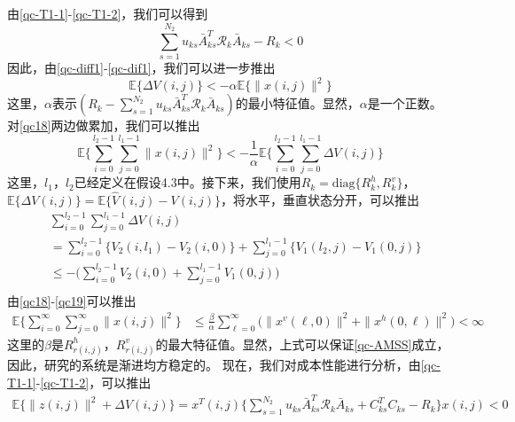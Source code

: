 	由\eqref{qc-T1-1}-\eqref{qc-T1-2}，我们可以得到
	\begin{equation}\label{qc-dif1}
		\sum_{s =1}^{N_2}u_{ks}\bar{A}^{T}_{ks}\mathcal{R}_{k}\bar{A}_{ks}-R_{k}<0
	\end{equation}
	因此，由\eqref{qc-diff1}-\eqref{qc-dif1}，我们可以进一步推出
	\begin{equation}\label{qc18}
		\mathbb{E}\{\varDelta V(i,j)\} < -\alpha \mathbb{E}\{\|x(i,j)\|^{2} \}
	\end{equation}
	这里，$\alpha$表示$(R_{k}-\sum_{s =1}^{N_2}u_{ks}\bar{A}^{T}_{ks}\mathcal{R}_{k}\bar{A}_{ks})$的最小特征值。显然，$\alpha$是一个正数。对\eqref{qc18}两边做累加，我们可以推出
	\begin{equation}
		\mathbb{E}\{ \sum_{i=0}^{l_2-1}\sum_{j=0}^{l_1-1}\|x(i,j)\|^{2} \}<-\frac{1}{\alpha}\mathbb{E}\{\sum_{i=0}^{l_2-1}\sum_{j=0}^{l_1-1}\varDelta V(i,j) \}
	\end{equation}
	这里，$l_1$，$l_2$已经定义在假设4.3中。接下来，我们使用$R_{k}=\mathrm{diag}\{R^{h}_{k},R^{v}_{k}\}$，$\mathbb{E}\{\varDelta V(i,j)\}=\mathbb{E}\{\hat{V}(i,j)-V(i,j) \}$，将水平，垂直状态分开，可以推出
	\begin{equation} \label{qc19}
	\begin{split}
	&\sum_{i=0}^{l_2-1}\sum_{j=0}^{l_1-1}  \varDelta V(i,j)\\&= \sum_{i=0}^{l_2-1}\big\{V_2(i,l_1) - V_2(i,0) \big\}+  \sum_{j=0}^{l_1-1}\big\{V_1(l_2,j) - V_1(0,j) \big\}\\
	&\leq -\big( \sum_{i=0}^{l_2-1}V_2(i,0) + \sum_{j=0}^{l_1-1}V_{1}(0,j)\big) \\
	\end{split}
	\end{equation} 
	由\eqref{qc18}-\eqref{qc19}可以推出
	\begin{equation}\label{qc20}
	\begin{split}
	\mathbb{E}\Big\{\sum_{i=0}^{\infty}\sum_{j=0}^{\infty}  \|x(i,j)\|^{2} \Big\} &\leq \frac{\beta}{\alpha} \sum_{\ell=0}^{\infty} \big(  \|x^{v}(\ell,0)\|^{2} + \|x^{h}(0,\ell)\|^{2} \big)<\infty
	\end{split}	
	\end{equation}
	这里的$\beta$是$R^{h}_{r(i,j)}$，$R^{v}_{r(i,j)}$的最大特征值。显然，上式可以保证\eqref{qc-AMSS}成立，因此，研究的系统是渐进均方稳定的。
	现在，我们对成本性能进行分析，由\eqref{qc-T1-1}-\eqref{qc-T1-2}，可以推出
	\begin{equation}
		\begin{split}
			\mathbb{E}\{\|z(i,j)\|^{2}+\varDelta V(i,j) \}=x^{T}(i,j)\{\sum_{s=1}^{N_2}u_{ks} \bar{A}^{T}_{ks}\mathcal{R}_{k}\bar{A}_{ks} +C^{T}_{ks}C_{ks}-R_{k} \}x(i,j)<0
		\end{split}
	\end{equation}
